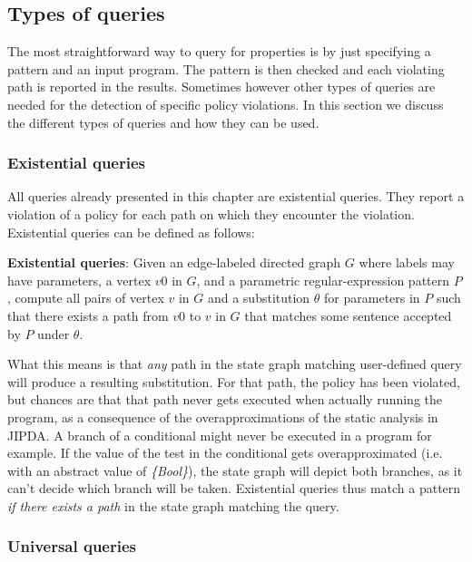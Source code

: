 
\subsection{Types of queries}
\label{subsec:TypesOfQueries}

The most straightforward way to query for properties is by just specifying a pattern and an input program. The pattern is then checked and each violating path is reported in the results. Sometimes however other types of queries are needed for the detection of specific policy violations. In this section we discuss the different types of queries and how they can be used.

\subsubsection{Existential queries}
All queries already presented in this chapter are existential queries. They report a violation of a policy for each path on which they encounter the violation. Existential queries can be defined as follows:
\begin{definition}
\textbf{Existential queries}: Given an edge-labeled directed graph $G$ where labels may have parameters, a vertex $v0$ in $G$, and a parametric regular-expression pattern $P$, compute all pairs of vertex $v$ in $G$ and a substitution $\theta$ for parameters in $P$ such that there exists a path from $v0$ to $v$ in $G$ that matches some sentence accepted by $P$ under $\theta$.
\end{definition}

\noindent What this means is that \textit{any} path in the state graph matching user-defined query will produce a resulting substitution. For that path, the policy has been violated, but chances are that that path never gets executed when actually running the program, as a consequence of the overapproximations of the static analysis in JIPDA. A branch of a conditional might never be executed in a program for example. If the value of the test in the conditional gets overapproximated (i.e. with an abstract value of \textit{\{Bool\}}), the state graph will depict both branches, as it can't decide which branch will be taken. Existential queries thus match a pattern \textit{if there exists a path} in the state graph matching the query.

\subsubsection{Universal queries}

